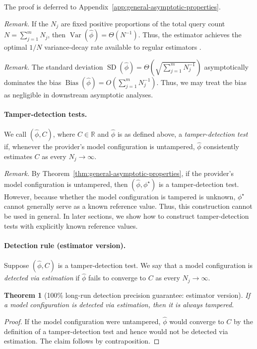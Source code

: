 \documentclass{article}
\newtheorem{theorem}{Theorem}
\begin{document}
The proof is deferred to Appendix~\ref{app:general-asymptotic-properties}.

\emph{Remark.} If the $N_j$ are fixed positive proportions of the total query
count $N=\sum_{j=1}^m N_j$, then
$\operatorname{Var}(\widehat{\phi})=\Theta(N^{-1})$. Thus, the estimator
achieves the optimal $1/N$ variance-decay rate available to regular estimators
\citep{hajek1970characterization}.

\emph{Remark.} The standard deviation
$\operatorname{SD}(\widehat{\phi})=\Theta(\sqrt{\sum_{j=1}^m N_j^{-1}})$
asymptotically dominates the bias
$\operatorname{Bias}(\widehat{\phi})=O(\sum_{j=1}^m N_j^{-1})$. Thus, we may
treat the bias as negligible in downstream asymptotic analyses.

\paragraph{Tamper-detection tests.}
We call $(\widehat{\phi},C)$, where $C\in\mathbb{R}$ and $\widehat{\phi}$ is as
defined above, a \emph{tamper-detection test} if, whenever the provider's model
configuration is untampered, $\widehat{\phi}$ consistently estimates $C$ as
every $N_j\to\infty$.

\emph{Remark.} By Theorem~\ref{thm:general-asymptotic-properties}, if the
provider's model configuration is untampered, then
$(\widehat{\phi},\phi^\star)$ is a tamper-detection test. However, because
whether the model configuration is tampered is unknown, $\phi^\star$ cannot
generally serve as a known reference value. Thus, this construction cannot be
used in general. In later sections, we show how to construct tamper-detection
tests with explicitly known reference values.

\paragraph{Detection rule (estimator version).}
Suppose $(\widehat{\phi},C)$ is a tamper-detection test. We say that a model
configuration is \emph{detected via estimation} if $\widehat{\phi}$ fails to
converge to $C$ as every $N_j\to\infty$.

\begin{theorem}[100\% long-run detection precision guarantee: estimator version]
\label{thm:estimator-detection-precision}
If a model configuration is detected via estimation, then it is always tampered.
\end{theorem}
\begin{proof}
If the model configuration were untampered, $\widehat{\phi}$ would converge to
$C$ by the definition of a tamper-detection test and hence would not be detected
via estimation. The claim follows by contraposition.
\end{proof}
\end{document}
